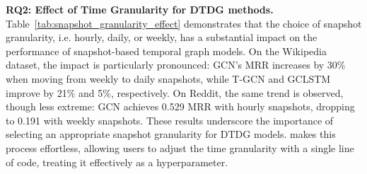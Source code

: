 

\textbf{RQ2: Effect of Time Granularity for DTDG methods. }
Table~\ref{tab:snapshot_granularity_effect} demonstrates that the choice of snapshot granularity, i.e. hourly, daily, or weekly, has a substantial impact on the performance of snapshot-based temporal graph models. On the Wikipedia dataset, the impact is particularly pronounced: GCN’s MRR increases by 30\% when moving from weekly to daily snapshots, while T-GCN and GCLSTM improve by 21\% and 5\%, respectively. On Reddit, the same trend is observed, though less extreme: GCN achieves 0.529 MRR with hourly snapshots, dropping to 0.191 with weekly snapshots. These results underscore the importance of selecting an appropriate snapshot granularity for DTDG models. \name makes this process effortless, allowing users to adjust the time granularity with a single line of code, treating it effectively as a hyperparameter.

